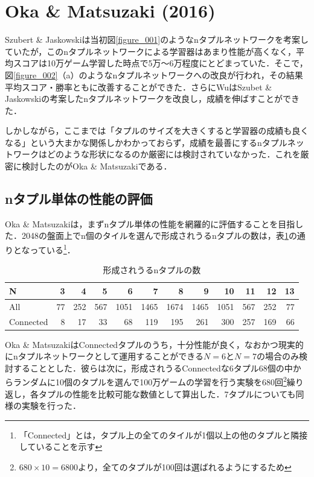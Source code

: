 \documentclass{suribt}
\begin{document}
\section{Oka \& Matsuzaki (2016)}
Szubert \& Jaskowskiは当初図\ref{figure_001}のようなnタプルネットワークを考案していたが，このnタプルネットワークによる学習器はあまり性能が高くなく，平均スコアは10万ゲーム学習した時点で5万〜6万程度にとどまっていた．そこで，図\ref{figure_002}（a）のようなnタプルネットワークへの改良が行われ，その結果平均スコア・勝率ともに改善することができた．さらにWuはSzubet \& Jaskowskiの考案したnタプルネットワークを改良し，成績を伸ばすことができた．

しかしながら，ここまでは「タプルのサイズを大きくすると学習器の成績も良くなる」という大まかな関係しかわかっておらず，成績を最善にするnタプルネットワークはどのような形状になるのか厳密には検討されていなかった．これを厳密に検討したのがOka \& Matsuzakiである．

\subsection{nタプル単体の性能の評価}
Oka \& Matsuzakiは，まずnタプル単体の性能を網羅的に評価することを目指した．2048の盤面上でn個のタイルを選んで形成されうるnタプルの数は，表\ref{tab:ntuplesNumber}の通りとなっている\footnote{「Connected」とは，タプル上の全てのタイルが1個以上の他のタプルと隣接していることを示す}．

\begin{table}[t]
	\begin{center}
		\caption{形成されうるnタプルの数}
		\begin{tabular}{l|r|r|r|r|r|r|r|r|r|r|r} \hline
		N & 3 & 4 & 5 & 6 & 7 & 8 & 9 & 10 & 11 & 12 & 13 \\ \hline \hline
		All & 77 & 252 & 567 & 1051 & 1465 & 1674 & 1465 & 1051 & 567 & 252 & 77 \\ \hline
		Connected & 8 & 17 & 33 & 68 & 119 & 195 & 261 & 300 & 257 & 169 & 66 \\ \hline
		\end{tabular}
		\label{tab:ntuplesNumber}
	\end{center}
\end{table}

Oka \& MatsuzakiはConnectedタプルのうち，十分性能が良く，なおかつ現実的にnタプルネットワークとして運用することができる$N=6$と$N=7$の場合のみ検討することとした．彼らは次に，形成されうるConnectedな6タプル68個の中からランダムに10個のタプルを選んで100万ゲームの学習を行う実験を680回\footnote{$680 \times 10 = 6800$より，全てのタプルが100回は選ばれるようにするため}繰り返し，各タプルの性能を比較可能な数値として算出した．7タプルについても同様の実験を行った．
\end{document}

